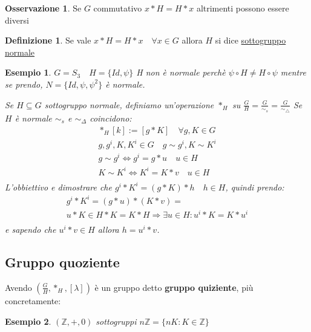 \documentclass{article}
\newtheorem{exmp}{Esempio}[section]
\theoremstyle{definition}
\newtheorem{definition}{Definizione}[section]
\newtheorem{oss}{Osservazione}[section]
\begin{document}
\begin{oss}
        Se $ G  $ commutativo $ x * H = H * x $ altrimenti possono essere diversi  
\end{oss}
\begin{definition}
        Se vale $ x * H = H * x   \quad  \forall x\in G$  allora $ H $ si dice \underline{sottogruppo normale}    
\end{definition}
\begin{exmp}
        $ G = S_3 \quad  H =    \{Id, \psi \}$ H non è normale perchè $ \psi \circ H \not = H \circ \psi $  mentre se prendo,
        $ N = \{Id, \psi, \psi^2 \}$ è normale. \par
        Se $ H \subseteq G$ sottogruppo normale, definiamo un'operazione $ *_H $ su $ \frac{G}{H} = \frac{G}{\sim_s} = \frac{G}{\sim_\triangle} $ Se $ H $ è normale $ \sim_s $ e $ \sim_\Delta $ coincidono:
        \begin{align*}
                [g] *_H [k] := [g * K] \quad \forall g,K \in G \\
                g,g^i,K,K^i \in G \quad g \sim g^i, K \sim K^i \\
                g \sim g^i \Leftrightarrow g^i = g * u \quad u \in H \\
                K \sim K^i \Leftrightarrow K^i = K * v \quad u \in H \\
        \end{align*}
        L'obbiettivo e dimostrare che $ g^i * K^i = (g * K) * h \quad h \in H $, quindi prendo:
        \begin{align*}
                g^i * K^i = (g * u) * (K * v) = \\
                u * K \in H * K = K * H \Rightarrow \exists u \in H : u^i * K = K * u^i \\
        \end{align*}
        e sapendo che $ u^i * v \in H $ allora $ h = u^i * v$.
\end{exmp} 


\subsection{Gruppo quoziente}
Avendo $ (\frac{G}{H}, *_H, [\lambda]) $ è un gruppo detto \textbf{gruppo quiziente}, più concretamente:
\begin{exmp}
        $ (\mathbb{Z}, +, 0) $ sottogruppi $ n\mathbb{Z} = \{nK : K \in \mathbb{Z}\}$ 
\end{exmp}
\end{document}
